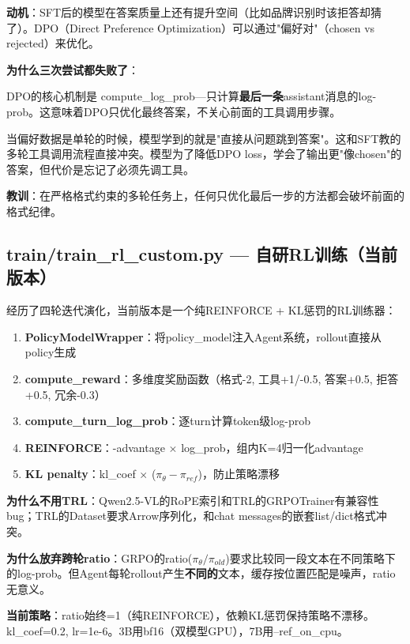 \documentclass[fontset=none,11pt,a4paper]{ctexart}
\begin{document}
\textbf{动机}：SFT后的模型在答案质量上还有提升空间（比如品牌识别时该拒答却猜了）。DPO（Direct Preference Optimization）可以通过"偏好对"（chosen vs rejected）来优化。

\textbf{为什么三次尝试都失败了}：

DPO的核心机制是 compute\_log\_prob---只计算\textbf{最后一条}assistant消息的log-prob。这意味着DPO只优化最终答案，不关心前面的工具调用步骤。

当偏好数据是单轮的时候，模型学到的就是"直接从问题跳到答案"。这和SFT教的多轮工具调用流程直接冲突。模型为了降低DPO loss，学会了输出更"像chosen"的答案，但代价是忘记了必须先调工具。

\textbf{教训}：在严格格式约束的多轮任务上，任何只优化最后一步的方法都会破坏前面的格式纪律。

\subsection{train/train\_rl\_custom.py --- 自研RL训练（当前版本）}

经历了四轮迭代演化，当前版本是一个纯REINFORCE + KL惩罚的RL训练器：

\begin{enumerate}[nosep]
    \item \textbf{PolicyModelWrapper}：将policy\_model注入Agent系统，rollout直接从policy生成
    \item \textbf{compute\_reward}：多维度奖励函数（格式-2, 工具+1/-0.5, 答案+0.5, 拒答+0.5, 冗余-0.3）
    \item \textbf{compute\_turn\_log\_prob}：逐turn计算token级log-prob
    \item \textbf{REINFORCE}：-advantage $\times$ log\_prob，组内K=4归一化advantage
    \item \textbf{KL penalty}：kl\_coef $\times$ ($\pi_\theta - \pi_{ref}$)，防止策略漂移
\end{enumerate}

\textbf{为什么不用TRL}：Qwen2.5-VL的RoPE索引和TRL的GRPOTrainer有兼容性bug；TRL的Dataset要求Arrow序列化，和chat messages的嵌套list/dict格式冲突。

\textbf{为什么放弃跨轮ratio}：GRPO的ratio($\pi_\theta/\pi_{old}$)要求比较同一段文本在不同策略下的log-prob。但Agent每轮rollout产生\textbf{不同的}文本，缓存按位置匹配是噪声，ratio无意义。

\textbf{当前策略}：ratio始终=1（纯REINFORCE），依赖KL惩罚保持策略不漂移。kl\_coef=0.2, lr=1e-6。3B用bf16（双模型GPU），7B用--ref\_on\_cpu。

\newpage
\end{document}
